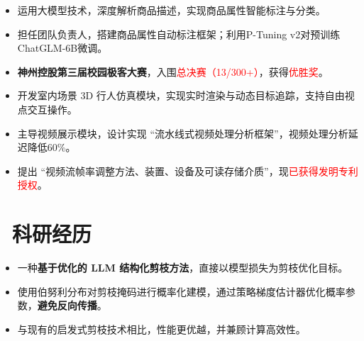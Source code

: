 \documentclass{resume}
\begin{document}
\begin{itemize}
  \item 运用大模型技术，深度解析商品描述，实现商品属性智能标注与分类。
  \item 担任团队负责人，搭建商品属性自动标注框架；利用P-Tuning v2对预训练ChatGLM-6B微调。
  \item \textbf{神州控股第三届校园极客大赛}，入围\textcolor{red}{总决赛（13/300+）}，获得\textcolor{red}{优胜奖}。
\end{itemize}


\begin{itemize}
  \item 开发室内场景 3D 行人仿真模块，实现实时渲染与动态目标追踪，支持自由视点交互操作。
  \item 主导视频展示模块，设计实现 “流水线式视频处理分析框架”，视频处理分析延迟降低60\%。
  \item 提出 “视频流帧率调整方法、装置、设备及可读存储介质”，现\textcolor{red}{已获得发明专利授权}。%
\end{itemize}

\vspace{-3mm}
\section{\faSearch\ 科研经历}
\begin{itemize}
  \item 一种\textbf{基于优化的 LLM 结构化剪枝方法}，直接以模型损失为剪枝优化目标。
  \item 使用伯努利分布对剪枝掩码进行概率化建模，通过策略梯度估计器优化概率参数，\textbf{避免反向传播}。
  \item 与现有的启发式剪枝技术相比，性能更优越，并兼顾计算高效性。
\end{itemize}

\end{document}

